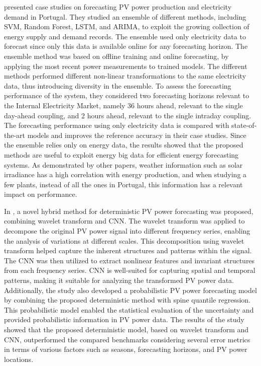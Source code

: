 \cite{9248865} presented case studies on forecasting PV power production and electricity demand in Portugal.
They studied an ensemble of different methods, including SVM, Random Forest, LSTM, and ARIMA, to exploit the growing collection of energy supply and demand records.
The ensemble used only electricity data to forecast since only this data is available online for any forecasting horizon.
The ensemble method was based on offline training and online forecasting, by applying the most recent power measurements to trained models.
The different methods performed different non-linear transformations to the same electricity data, thus introducing diversity in the ensemble.
To assess the forecasting performance of the system, they considered two forecasting horizons relevant to the Internal Electricity Market, namely 36 hours ahead, relevant to the single day-ahead coupling, and 2 hours ahead, relevant to the single intraday coupling.
The forecasting performance using only electricity data is compared with state-of-the-art models and improves the reference accuracy in their case studies.
Since the ensemble relies only on energy data, the results showed that the proposed methods are useful to exploit energy big data for efficient energy forecasting systems.
As demonstrated by other papers, weather information such as solar irradiance has a high correlation with energy production, and when studying a few plants, instead of all the ones in Portugal, this information has a relevant impact on performance.

In \cite{WANG2017409}, a novel hybrid method for deterministic PV power forecasting was proposed, combining wavelet transform and CNN.
The wavelet transform was applied to decompose the original PV power signal into different frequency series, enabling the analysis of variations at different scales.
This decomposition using wavelet transform helped capture the inherent structures and patterns within the signal.
The CNN was then utilized to extract nonlinear features and invariant structures from each frequency series.
CNN is well-suited for capturing spatial and temporal patterns, making it suitable for analyzing the transformed PV power data.
Additionally, the study also developed a probabilistic PV power forecasting model by combining the proposed deterministic method with spine quantile regression. This probabilistic model enabled the statistical evaluation of the uncertainty and provided probabilistic information in PV power data.
The results of the study showed that the proposed deterministic model, based on wavelet transform and CNN, outperformed the compared benchmarks considering several error metrics in terms of various factors such as seasons, forecasting horizons, and PV power locations.

